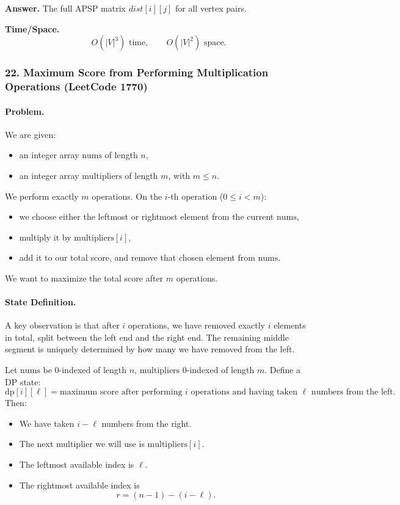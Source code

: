 \documentclass[9pt]{extarticle}
\begin{document}
\textbf{Answer.}  
The full APSP matrix \(dist[i][j]\) for all vertex pairs.

\textbf{Time/Space.}  
\[
O(|V|^3) \text{ time}, \qquad O(|V|^2) \text{ space}.
\]
\subsubsection{22. Maximum Score from Performing Multiplication Operations (LeetCode 1770)}

\paragraph{Problem.}
We are given:
\begin{itemize}
    \item an integer array \(\text{nums}\) of length \(n\),
    \item an integer array \(\text{multipliers}\) of length \(m\), with \(m \le n\).
\end{itemize}
We perform exactly \(m\) operations. On the \(i\)-th operation (\(0 \le i < m\)):
\begin{itemize}
    \item we choose either the leftmost or rightmost element from the current \(\text{nums}\),
    \item multiply it by \(\text{multipliers}[i]\),
    \item add it to our total score, and remove that chosen element from \(\text{nums}\).
\end{itemize}
We want to maximize the total score after \(m\) operations.

\paragraph{State Definition.}
A key observation is that after \(i\) operations, we have removed exactly \(i\) elements in total, split between the left end and the right end. The remaining middle segment is uniquely determined by how many we have removed from the left.

Let \(\text{nums}\) be 0-indexed of length \(n\), \(\text{multipliers}\) 0-indexed of length \(m\).
Define a DP state:
\[
\text{dp}[i][\ell] = \text{maximum score after performing } i \text{ operations and having taken } \ell \text{ numbers from the left.}
\]
Then:
\begin{itemize}
    \item We have taken \(i - \ell\) numbers from the right.
    \item The next multiplier we will use is \(\text{multipliers}[i]\).
    \item The leftmost available index is \(\ell\).
    \item The rightmost available index is
    \[
    r = (n - 1) - (i - \ell).
    \]
\end{itemize}
\end{document}
